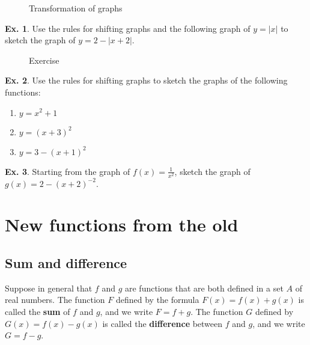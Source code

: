 \documentclass[10pt,a4paper]{book}
\theoremstyle{definition}\newtheorem{definition}{Definition}
\theoremstyle{definition}\newtheorem{fact}{Fact}
\theoremstyle{definition}\newtheorem{ex}{Ex.}
\theoremstyle{definition}\newtheorem{project}{Project}
\theoremstyle{definition}\newtheorem{problem}{Problem}
\theoremstyle{definition}\newtheorem{example}{Example}
\numberwithin{theorem}{chapter}
\numberwithin{corollary}{chapter}
\numberwithin{assumption}{chapter}
\numberwithin{definition}{chapter}
\numberwithin{prop}{chapter}
\numberwithin{notation}{chapter}
\numberwithin{problem}{chapter}
\numberwithin{example}{chapter}
\numberwithin{fact}{chapter}
\numberwithin{ex}{chapter}
\begin{document}
	\begin{figure}[ht]
		\centering
		\caption{Transformation of graphs}
	\end{figure}
	\pagebreak
	
	\begin{ex}
		Use the rules for shifting graphs and the following graph of $y=|x|$ to sketch the graph of $y=2-|x+2|$.
	\end{ex}
	
	\begin{figure}[ht]
		\centering
		\caption{Exercise}
	\end{figure}
	
	\begin{ex}
		Use the rules for shifting graphs to sketch the graphs of the following functions:
		\begin{enumerate}[label=(\alph*)]
			\item $y=x^2+1$
			\item $y=(x+3)^2$
			\item $y=3-(x+1)^2$
		\end{enumerate}
	\end{ex}
	
	\begin{ex}
		Starting from the graph of $f(x)=\frac{1}{x^2}$, sketch the graph of $g(x)=2-(x+2)^{-2}$.
	\end{ex}
	\pagebreak
	
	\section{New functions from the old}
	\subsection{Sum and difference}
	Suppose in general that $f$ and $g$ are functions that are both defined in a set $A$ of real numbers. The function $F$ defined by the formula $F(x) = f (x) + g(x)$ is called the \textbf{sum} of $f$ and $g$, and we write $F = f + g$. The function $G$ defined by $G(x) = f (x) - g(x)$ is called the \textbf{difference} between $f$ and $g$, and we write $G = f - g$.
	
\end{document}
